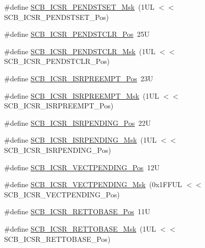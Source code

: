 \begin{DoxyCompactItemize}
\item 
\#define \hyperlink{group___c_m_s_i_s___s_c_b_ga7325b61ea0ec323ef2d5c893b112e546}{S\-C\-B\-\_\-\-I\-C\-S\-R\-\_\-\-P\-E\-N\-D\-S\-T\-S\-E\-T\-\_\-\-Msk}~(1\-U\-L $<$$<$ S\-C\-B\-\_\-\-I\-C\-S\-R\-\_\-\-P\-E\-N\-D\-S\-T\-S\-E\-T\-\_\-\-Pos)
\item 
\#define \hyperlink{group___c_m_s_i_s___s_c_b_gadbe25e4b333ece1341beb1a740168fdc}{S\-C\-B\-\_\-\-I\-C\-S\-R\-\_\-\-P\-E\-N\-D\-S\-T\-C\-L\-R\-\_\-\-Pos}~25\-U
\item 
\#define \hyperlink{group___c_m_s_i_s___s_c_b_gab241827d2a793269d8cd99b9b28c2157}{S\-C\-B\-\_\-\-I\-C\-S\-R\-\_\-\-P\-E\-N\-D\-S\-T\-C\-L\-R\-\_\-\-Msk}~(1\-U\-L $<$$<$ S\-C\-B\-\_\-\-I\-C\-S\-R\-\_\-\-P\-E\-N\-D\-S\-T\-C\-L\-R\-\_\-\-Pos)
\item 
\#define \hyperlink{group___c_m_s_i_s___s_c_b_ga11cb5b1f9ce167b81f31787a77e575df}{S\-C\-B\-\_\-\-I\-C\-S\-R\-\_\-\-I\-S\-R\-P\-R\-E\-E\-M\-P\-T\-\_\-\-Pos}~23\-U
\item 
\#define \hyperlink{group___c_m_s_i_s___s_c_b_gaa966600396290808d596fe96e92ca2b5}{S\-C\-B\-\_\-\-I\-C\-S\-R\-\_\-\-I\-S\-R\-P\-R\-E\-E\-M\-P\-T\-\_\-\-Msk}~(1\-U\-L $<$$<$ S\-C\-B\-\_\-\-I\-C\-S\-R\-\_\-\-I\-S\-R\-P\-R\-E\-E\-M\-P\-T\-\_\-\-Pos)
\item 
\#define \hyperlink{group___c_m_s_i_s___s_c_b_ga10749d92b9b744094b845c2eb46d4319}{S\-C\-B\-\_\-\-I\-C\-S\-R\-\_\-\-I\-S\-R\-P\-E\-N\-D\-I\-N\-G\-\_\-\-Pos}~22\-U
\item 
\#define \hyperlink{group___c_m_s_i_s___s_c_b_ga056d74fd538e5d36d3be1f28d399c877}{S\-C\-B\-\_\-\-I\-C\-S\-R\-\_\-\-I\-S\-R\-P\-E\-N\-D\-I\-N\-G\-\_\-\-Msk}~(1\-U\-L $<$$<$ S\-C\-B\-\_\-\-I\-C\-S\-R\-\_\-\-I\-S\-R\-P\-E\-N\-D\-I\-N\-G\-\_\-\-Pos)
\item 
\#define \hyperlink{group___c_m_s_i_s___s_c_b_gada60c92bf88d6fd21a8f49efa4a127b8}{S\-C\-B\-\_\-\-I\-C\-S\-R\-\_\-\-V\-E\-C\-T\-P\-E\-N\-D\-I\-N\-G\-\_\-\-Pos}~12\-U
\item 
\#define \hyperlink{group___c_m_s_i_s___s_c_b_gacb6992e7c7ddc27a370f62878a21ef72}{S\-C\-B\-\_\-\-I\-C\-S\-R\-\_\-\-V\-E\-C\-T\-P\-E\-N\-D\-I\-N\-G\-\_\-\-Msk}~(0x1\-F\-F\-U\-L $<$$<$ S\-C\-B\-\_\-\-I\-C\-S\-R\-\_\-\-V\-E\-C\-T\-P\-E\-N\-D\-I\-N\-G\-\_\-\-Pos)
\item 
\#define \hyperlink{group___c_m_s_i_s___s_c_b_ga403d154200242629e6d2764bfc12a7ec}{S\-C\-B\-\_\-\-I\-C\-S\-R\-\_\-\-R\-E\-T\-T\-O\-B\-A\-S\-E\-\_\-\-Pos}~11\-U
\item 
\#define \hyperlink{group___c_m_s_i_s___s_c_b_gaca6fc3f79bb550f64fd7df782ed4a5f6}{S\-C\-B\-\_\-\-I\-C\-S\-R\-\_\-\-R\-E\-T\-T\-O\-B\-A\-S\-E\-\_\-\-Msk}~(1\-U\-L $<$$<$ S\-C\-B\-\_\-\-I\-C\-S\-R\-\_\-\-R\-E\-T\-T\-O\-B\-A\-S\-E\-\_\-\-Pos)

\end{DoxyCompactItemize}
